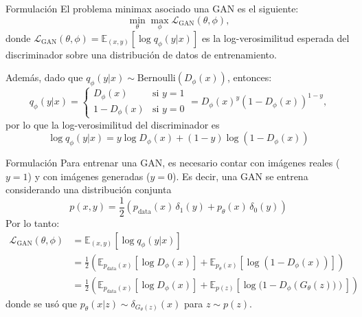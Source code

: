 \documentclass{beamer}
\begin{document}
\begin{frame}{Formulación}
    El problema minimax asociado una GAN es el siguiente:
    \begin{equation*}
        \min_\theta \max_\phi
        \mathcal{L}_\text{GAN}(\theta,\phi),
    \end{equation*}
    donde $\mathcal{L}_\text{GAN}(\theta,\phi)=\mathbb{E}_{(x,y)}\left[\log q_\phi(y|x)\right]$ es la log-verosimilitud esperada del discriminador sobre una distribución de datos de entrenamiento.

    Además, dado que $ q_\phi(y|x)\sim\text{Bernoulli}(D_\phi(x))$, entonces:
    \begin{equation*}
        q_\phi(y|x)=
        \begin{cases}
            D_\phi(x)   & \text{si } y=1 \\
            1-D_\phi(x) & \text{si }y=0
        \end{cases}
        =D_\phi(x)^y \left(1-D_\phi(x)\right)^{1-y},
    \end{equation*}
    por lo que la log-verosimilitud del discriminador es
    \begin{equation*}
        \log q_\phi(y|x)=y\log D_\phi(x)+(1-y)\log\left(1-D_\phi(x)\right)
    \end{equation*}
\end{frame}

\begin{frame}{Formulación}
    Para entrenar una GAN, es necesario contar con imágenes reales ($y=1$) y con imágenes generadas ($y=0$). Es decir, una GAN se entrena considerando una distribución conjunta
    \begin{equation*}
        p(x,y) = \frac{1}{2}\left(p_\text{data}(x)\,\delta_1(y)+p_\theta(x)\,\delta_0(y)\right)
    \end{equation*}
    Por lo tanto:
    \begin{align*}
        \mathcal{L}_\text{GAN}(\theta,\phi)
         & =\mathbb{E}_{(x,y)}\left[\log q_\phi(y|x)\right]\\
         & =\frac{1}{2}\left(\mathbb{E}_{p_\text{data}(x)}\left[\log D_\phi(x)\right]
        + \mathbb{E}_{p_\theta(x)}\left[\log (1-D_\phi(x))\right]\right)\\
         & =\frac{1}{2}\left(\mathbb{E}_{p_\text{data}(x)}\left[\log D_\phi(x)\right]+\mathbb{E}_{p(z)}\left[\log (1-D_\phi\left(G_\theta(z))\right)\right]\right)
    \end{align*}
    donde se usó que $p_\theta(x|z)\sim\delta_{G_\theta(z)}(x)$ para $z\sim p(z)$.
\end{frame}
\end{document}
